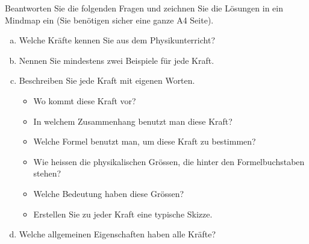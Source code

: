 
\begin{aufgabe}
	Beantworten Sie die folgenden Fragen und zeichnen Sie die Lösungen in ein Mindmap ein (Sie benötigen sicher eine ganze A4 Seite).
	\begin{enumerate}[a)]
		\item Welche Kräfte kennen Sie aus dem Physikunterricht?
		\item Nennen Sie mindestens zwei Beispiele für jede Kraft.
		\item Beschreiben Sie jede Kraft mit eigenen Worten. 
			\begin{itemize}
				\item Wo kommt diese Kraft vor?
				\item In welchem Zusammenhang benutzt man diese Kraft? 
				\item Welche Formel benutzt man, um diese Kraft zu bestimmen? 
				\item Wie heissen die physikalischen Grössen, die hinter den Formelbuchstaben stehen?
				\item Welche Bedeutung haben diese Grössen?
				\item Erstellen Sie zu jeder Kraft eine typische Skizze.
			\end{itemize}
		\item Welche allgemeinen Eigenschaften haben alle Kräfte?
	\end{enumerate}
\end{aufgabe}

